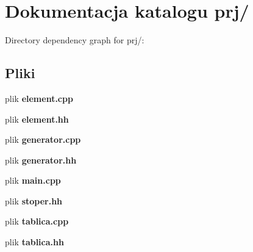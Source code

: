 \section{\-Dokumentacja katalogu prj/}
\label{dir_efc0b695d8f639b12780e8c2a9f62f85}
\-Directory dependency graph for prj/\-:
\subsection*{\-Pliki}
\begin{DoxyCompactItemize}
\item 
plik {\bf element.\-cpp}
\item 
plik {\bf element.\-hh}
\item 
plik {\bf generator.\-cpp}
\item 
plik {\bf generator.\-hh}
\item 
plik {\bf main.\-cpp}
\item 
plik {\bf stoper.\-hh}
\item 
plik {\bf tablica.\-cpp}
\item 
plik {\bf tablica.\-hh}
\end{DoxyCompactItemize}
